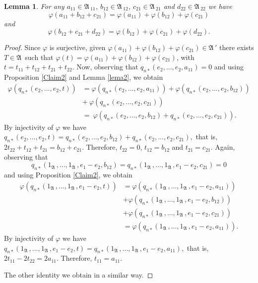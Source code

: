\documentclass{amsart}
\newtheorem{lemma}{Lemma}[section]
\def\A{{\mathfrak A}\, }
\begin{document}
\begin{lemma}\label{lema3}
For any $a_{11} \in \A_{11}$, $b_{12} \in \A_{12}$, $c_{21} \in \A_{21}$ and $d_{22} \in \A_{22}$ we have 
$$\varphi(a_{11} + b_{12} + c_{21}) = \varphi(a_{11}) + \varphi(b_{12})+ \varphi(c_{21})$$
and
$$\varphi(b_{12} + c_{21} + d_{22}) = \varphi(b_{12})+ \varphi(c_{21}) + \varphi(d_{22}).$$
\end{lemma}

\begin{proof}
Since $\varphi$ is surjective, given $\varphi(a_{11})+\varphi(b_{12})+\varphi(c_{21}) \in \A'$ there exists $T \in \A$ such that 
$\varphi(t) = \varphi(a_{11})+\varphi(b_{12})+\varphi(c_{21})$, with $t=t_{11}+t_{12}+t_{21}+t_{22}$. Now, observing that
$q_{n*}(e_2,...,e_2,a_{11})=0$ and using Proposition \ref{Claim2} and Lemma \ref{lema2}, we obtain
$$
\begin{aligned}
\varphi(q_{n*}(e_2,...,e_2,t)) 
&= \varphi(q_{n*}(e_2,...,e_2,a_{11})) + \varphi(q_{n*}(e_2,...,e_2,b_{12})) \\
&+ \ \varphi(q_{n*}(e_2,...,e_2,c_{21})) \\ 
&= \ \varphi(q_{n*}(e_2,...,e_2,b_{12}) + q_{n*}(e_2,...,e_2,c_{21})).
\end{aligned}
$$
By injectivity of $\varphi$ we have $q_{n*}(e_2,...,e_2,t)=q_{n*}(e_2,...,e_2,b_{12}) + q_{n*}(e_2,...,e_2,c_{21}),$ that is,
$2t_{22} + t_{12} + t_{21} = b_{12} + c_{21}.$ Therefore, $t_{22}=0$, $t_{12}=b_{12}$ and $t_{21}=c_{21}$.
Again, observing that 
\[
q_{n*}(1_\A,...,1_\A,e_1-e_2,b_{12})=q_{n*}(1_\A,...,1_\A,e_1-e_2,c_{21})=0
\]
and using 
Proposition \ref{Claim2}, we obtain
$$
\begin{aligned}
\varphi(q_{n*}(1_\A,...,1_\A,e_1-e_2,t)) &= \varphi(q_{n*}(1_\A,...,1_\A,e_1-e_2,a_{11}))\\&+\varphi(q_{n*}(1_\A,...,1_\A,e_1-e_2,b_{12})) \\
&+ \varphi(q_{n*}(1_\A,...,1_\A,e_1-e_2,c_{21})) \\
&= \varphi(q_{n*}(1_\A,...,1_\A,e_1-e_2,a_{11})).
\end{aligned}
$$
By injectivity of $\varphi$ we have $q_{n*}(1_\A,...,1_\A,e_1-e_2,t) = q_{n*}(1_\A,...,1_\A,e_1-e_2,a_{11}),
$ that is,
$2t_{11} - 2t_{22} = 2a_{11}.$ Therefore, $t_{11}=a_{11}$.

The other identity we obtain in a similar way.
\end{proof}
\end{document}
